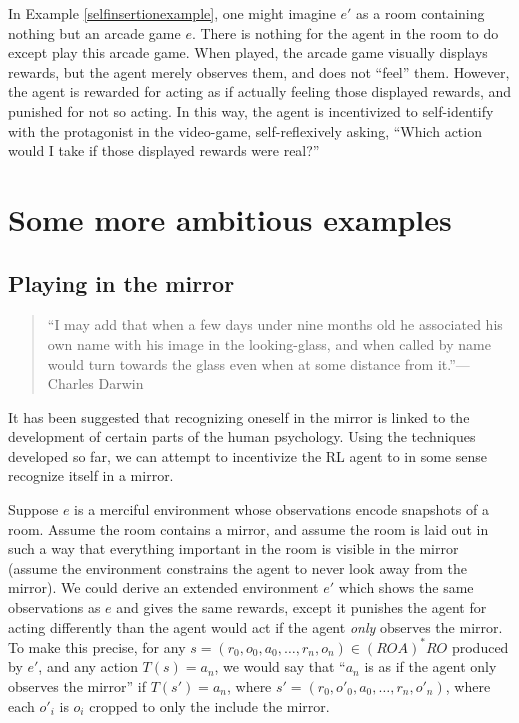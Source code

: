 \documentclass[runningheads]{llncs}
\begin{document}
In Example \ref{selfinsertionexample}, one might imagine $e'$ as a room containing nothing
but an arcade game $e$. There is nothing for the agent in the room to do
except play this arcade game.
When played, the arcade game
visually displays rewards, but the agent merely observes them, and does not
``feel'' them. However, the agent is rewarded for acting as if actually feeling
those displayed rewards, and punished for not so acting.
In this way, the agent is incentivized
to self-identify with the protagonist in the video-game, self-reflexively asking,
``Which action would I take if those displayed rewards were real?''


\section{Some more ambitious examples}

\subsection{Playing in the mirror}

\begin{quote}
    ``I may add that when a few days under nine months old he associated his own name with
    his image in the looking-glass, and when called by name would turn towards the glass
    even when at some distance from it.''---Charles Darwin \cite{darwin1877biographical}
\end{quote}

It has been suggested \cite{lacan} that recognizing oneself in the mirror is linked
to the development of certain parts of the human psychology. Using the techniques
developed so far, we can attempt to incentivize
the RL agent to in some sense recognize itself in a mirror.

\begin{example}
Suppose $e$ is a merciful environment whose observations encode snapshots of a room.
Assume the room contains a mirror, and assume the room is laid out in such a way that
everything important in the room is visible in the mirror (assume
the environment constrains the agent to never look away from
the mirror). We could derive an extended environment $e'$ which shows
the same observations as $e$ and gives the same rewards,
except it punishes the agent for acting differently than the agent
would act if the agent \emph{only} observes the mirror.
To make this precise, for any $s=(r_0,o_0,a_0,\ldots,r_n,o_n)\in (ROA)^*RO$ produced
by $e'$, and any action $T(s)=a_n$, we would say that ``$a_n$ is as if the
agent only observes the mirror''
if $T(s')=a_n$, where $s'=(r_0,o'_0,a_0,\ldots,r_n,o'_n)$,
where each $o'_i$ is $o_i$ cropped to only the include the mirror.
\end{example}
\end{document}
